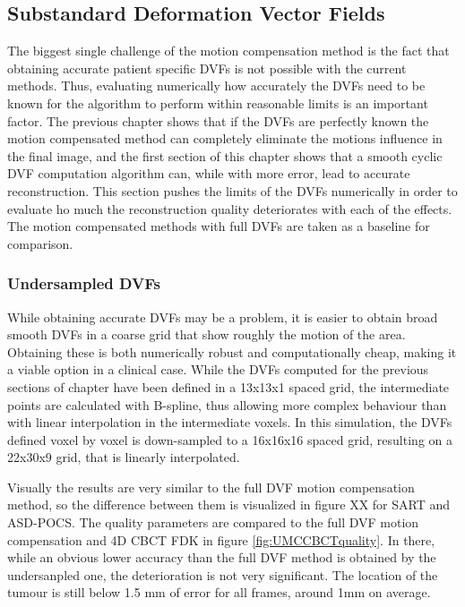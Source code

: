 \subsection{Substandard Deformation Vector Fields}
The biggest single challenge of the motion compensation method is the fact that obtaining accurate patient specific DVFs is not possible with the current methods. Thus, evaluating numerically how accurately the DVFs need to be known for the algorithm to perform within reasonable limits is an important factor. The previous chapter shows that if the DVFs are perfectly known the motion compensated method can completely eliminate the motions influence in the final image, and the first section of this chapter shows that a smooth cyclic DVF computation algorithm can, while with more error, lead to accurate reconstruction. This section pushes the limits of the DVFs numerically in order to evaluate ho much the reconstruction quality deteriorates with each of the effects. The motion compensated methods with full DVFs are taken as a baseline for comparison.

\subsubsection{Undersampled DVFs}
While obtaining accurate DVFs may be a problem, it is easier to obtain broad smooth DVFs in a coarse grid that show roughly the motion of the area. Obtaining these is both numerically robust and  computationally cheap, making it a viable option in a clinical case. While the DVFs computed for the previous sections of chapter have been defined in a 13x13x1 spaced grid, the intermediate points are calculated with B-spline, thus allowing more complex behaviour than with linear interpolation in the intermediate voxels. In this simulation, the DVFs defined voxel by voxel is down-sampled to a 16x16x16 spaced grid, resulting on a 22x30x9 grid, that is linearly interpolated. 

Visually the results are very similar to the full DVF motion compensation method, so the difference between them is visualized in figure XX for SART and ASD-POCS. The quality parameters are compared to the full DVF motion compensation and 4D CBCT FDK in figure \ref{fig:UMCCBCTquality}. In there, while an obvious lower accuracy than the full DVF method is obtained by the undersanpled one, the deterioration is not very significant. The location of the tumour is still below 1.5 mm of error for all frames, around 1mm on average.

